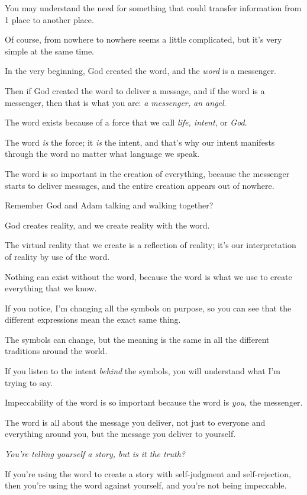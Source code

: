 \documentclass{article}
\numberwithin{equation}{section}
\begin{document}
You may understand the need for something that could transfer information from 1 place to another place.

Of course, from nowhere to nowhere seems a little complicated, but it's very simple at the same time.

In the very beginning, God created the word, and the \textit{word} is a messenger.

Then if God created the word to deliver a message, and if the word is a messenger, then that is what you are: \textit{a messenger, an angel}.

%
The word exists because of a force that we call \textit{life, intent}, or \textit{God}.

The word \textit{is} the force; it \textit{is} the intent, and that's why our intent manifests through the word no matter what language we speak.

The word is so important in the creation of everything, because the messenger starts to deliver messages, and the entire creation appears out of nowhere.

%
Remember God and Adam talking and walking together?

God creates reality, and we create reality with the word.

The virtual reality that we create is a reflection of reality; it's our interpretation of reality by use of the word.

Nothing can exist without the word, because the word is what we use to create everything that we know.

%
If you notice, I'm changing all the symbols on purpose, so you can see that the different expressions mean the exact same thing.

The symbols can change, but the meaning is the same in all the different traditions around the world.

If you listen to the intent \textit{behind} the symbols, you will understand what I'm trying to say.

Impeccability of the word is so important because the word is \textit{you}, the messenger.

The word is all about the message you deliver, not just to everyone and everything around you, but the message you deliver to yourself.

%
\textit{You're telling yourself a story, but is it the truth?}

If you're using the word to create a story with self-judgment and self-rejection, then you're using the word against yourself, and you're not being impeccable.
\end{document}
